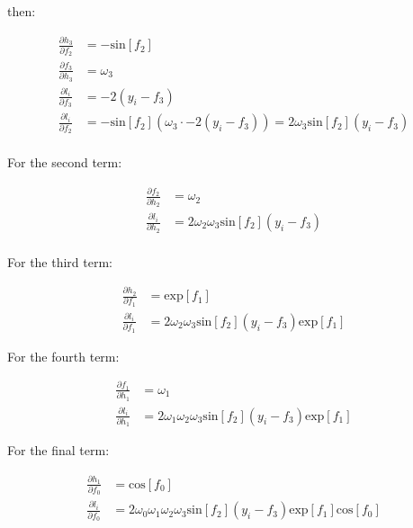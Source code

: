 \documentclass[12pt]{report}
\begin{document}
then:

\begin{align*}
    \frac{\partial h_{3}}{\partial f_{2}} & = -\text{sin}[f_{2}]                                                                                  \\
    \frac{\partial f_{3}}{\partial h_{3}} & = \omega_{3}                                                                                          \\
    \frac{\partial l_{i}}{\partial f_{3}} & = -2(y_{i} - f_{3})                                                                                   \\
    \frac{\partial l_{i}}{\partial f_{2}} & = -\text{sin}[f_{2}](\omega_{3}\cdot -2(y_{i} - f_{3})) = 2\omega_{3}\text{sin}[f_{2}](y_{i} - f_{3}) \\
\end{align*}

For the second term:

\begin{align*}
    \frac{\partial f_{2}}{\partial h_{2}} & = \omega_{2}                                            \\
    \frac{\partial l_{i}}{\partial h_{2}} & = 2\omega_{2}\omega_{3}\text{sin}[f_{2}](y_{i} - f_{3}) \\
\end{align*}

For the third term:

\begin{align*}
    \frac{\partial h_{2}}{\partial f_{1}} & = \text{exp}[f_{1}]                                                      \\
    \frac{\partial l_{i}}{\partial f_{1}} & = 2\omega_{2}\omega_{3}\text{sin}[f_{2}](y_{i} - f_{3})\text{exp}[f_{1}]
\end{align*}

For the fourth term:

\begin{align*}
    \frac{\partial f_{1}}{\partial h_{1}} & = \omega_{1}                                                                       \\
    \frac{\partial l_{i}}{\partial h_{1}} & = 2\omega_{1}\omega_{2}\omega_{3}\text{sin}[f_{2}](y_{i} - f_{3})\text{exp}[f_{1}]
\end{align*}

For the final term:

\begin{align*}
    \frac{\partial h_{1}}{\partial f_{0}} & = \text{cos}[f_{0}]                                                                                           \\
    \frac{\partial l_{i}}{\partial f_{0}} & = 2\omega_{0}\omega_{1}\omega_{2}\omega_{3}\text{sin}[f_{2}](y_{i} - f_{3})\text{exp}[f_{1}]\text{cos}[f_{0}]
\end{align*}
\newpage
\end{document}
